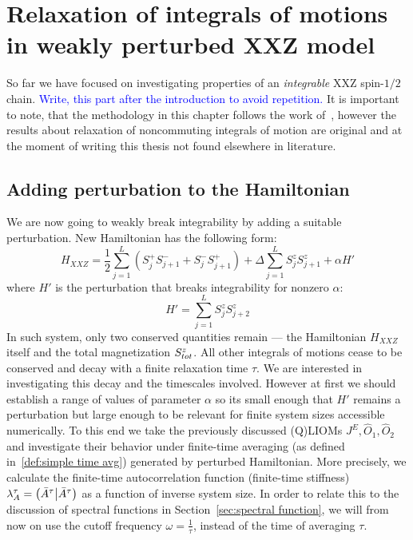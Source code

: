 \chapter{Relaxation of integrals of motions in weakly perturbed XXZ model}
\thispagestyle{chapterBeginStyle}

So far we have focused on investigating properties of an \textit{integrable} XXZ
spin-\(1/2\) chain.
\textcolor{blue}{Write, this part after the introduction to avoid repetition.}
It is important to note, that the methodology in this chapter follows the work
of~\textcite{Mierzejewski2015Approx}, however the results about relaxation of noncommuting integrals
of motion are original and at the moment of writing this thesis not found elsewhere
in literature. 
\section{Adding perturbation to the Hamiltonian}
We are now going to weakly break integrability by adding a suitable perturbation.
New Hamiltonian has the following form:
\begin{equation}
    H_{XXZ} = \frac{1}{2}\sum_{j = 1}^{L}\left( S^{+}_{j} S^{-}_{j+1} + 
    S^{-}_{j}S^{+}_{j+1} \right) + \Delta\sum_{j = 1}^{L} S^{z}_{j}S^{z}_{j+1}
    + \alpha H'
    \label{eq:HXXZ perturbed}
\end{equation}
where \(H'\) is the perturbation that breaks integrability for nonzero \(\alpha \):
\begin{equation}
    H'=\sum_{j = 1}^{L} S^{z}_{j}S^{z}_{j+2}
    \label{eq:perturbation}
\end{equation}
In such system, only two conserved quantities remain --- the Hamiltonian \(H_{XXZ}\) itself 
and the total magnetization \(S^{z}_{tot}\). All other integrals of motions cease to be conserved
and decay with a finite relaxation time \(\tau\). We are interested in investigating this
decay and the timescales involved. However at first we should establish a range of
values of parameter \(\alpha\) so its small enough that \(H'\) remains a perturbation
but large enough to be relevant for finite system sizes accessible numerically. 
To this end we take the previously discussed (Q)LIOMs  \(J^E, \hat{O}_1,\hat{O}_2\)
and investigate their behavior under finite-time averaging (as defined in~\eqref{def:simple time avg})
generated by perturbed Hamiltonian. More precisely, we calculate the finite-time autocorrelation
function (finite-time stiffness) \(\lambda^{\tau}_A = \left(\bar{A}^{\tau} \middle| \bar{A}^{\tau}\right)\) as
a function of inverse system size.
In order to relate this to the discussion of spectral functions in Section~\ref{sec:spectral function},
we will from now on use the cutoff frequency \(\omega = \frac{1}{\tau}\), instead of the time of
averaging \(\tau\). 

